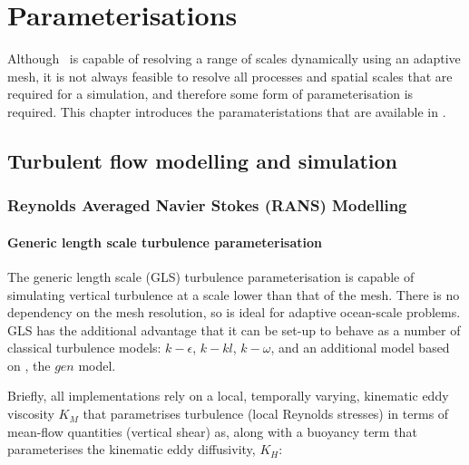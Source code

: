 \chapter{Parameterisations}\label{chap:parameterisations}

Although \fluidity\ is capable of resolving a range of scales dynamically using
an adaptive mesh, it is not always feasible to resolve all processes and spatial scales that are
required for a simulation, and therefore some form of parameterisation is required.
This chapter introduces the paramateristations that are available in \fluidity.

\section{Turbulent flow modelling and simulation}
\label{sec:turbulence_parametrisations}

\subsection{Reynolds Averaged Navier Stokes (RANS) Modelling}
\label{sec:RANS}

\subsubsection{Generic length scale turbulence parameterisation}\label{sec:GLS}

The generic length scale (GLS) turbulence parameterisation is capable of simulating vertical
turbulence at a scale lower than that of the mesh. There is no dependency on the mesh resolution,
so is ideal for adaptive ocean-scale problems. GLS has the additional advantage that it
can be set-up to behave as a number of classical turbulence models:
$k-\epsilon$, $k-kl$, $k-\omega$,
and an additional model based on \citet{umlauf2003}, the $gen$ model.

Briefly, all implementations rely on a local, temporally varying, kinematic eddy
viscosity $K_M$ that parametrises turbulence (local Reynolds stresses) in terms of mean-flow
quantities (vertical shear) as, along
with a buoyancy term that parameterises the kinematic eddy diffusivity, $K_H$:

